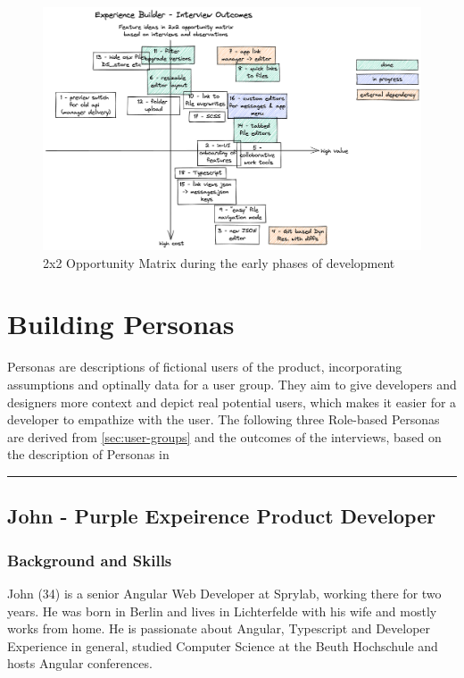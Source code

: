 \begin{figure}[ht]
	\centering
  \includegraphics[width=\textwidth]{pics/feature_cost_matrix.excalidraw.png}
	\caption{2x2 Opportunity Matrix during the early phases of development}
	\label{fig:opportunitymatrix}
\end{figure}


\section{Building Personas}
\label{sec:personas}

Personas are descriptions of fictional users of the product, incorporating assumptions and optinally data for a user group.
They aim to give developers and designers more context and depict real potential users, which makes it easier for a developer to empathize with the user.
The following three Role-based Personas are derived from \ref{sec:user-groups} and the outcomes of the interviews, based on the description of Personas in \cite[pp. 403-405]{Interactiondesign:2019ys}
\\
\hrule
\subsection{John - Purple Expeirence Product Developer}
\subsubsection{Background and Skills}
John (34) is a senior Angular Web Developer at Sprylab, working there for two years. He was born in Berlin and lives in Lichterfelde with his wife and mostly works from home. He is passionate about Angular, Typescript and Developer Experience in general, studied Computer Science at the Beuth Hochschule and hosts Angular conferences.
\\
